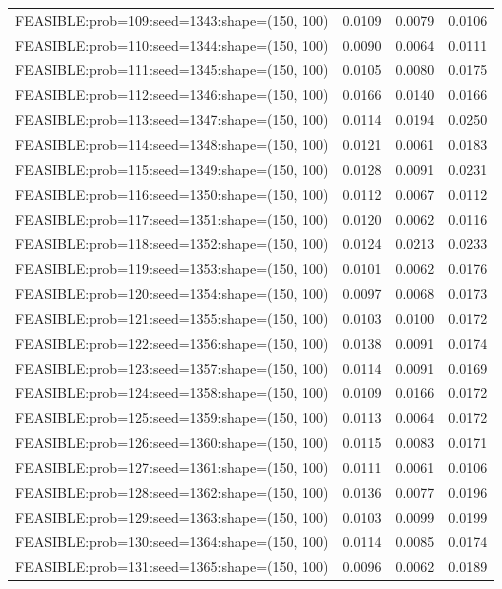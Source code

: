 \begin{longtable}{lccc}
FEASIBLE:prob=109:seed=1343:shape=(150, 100) &   0.0109 & 0.0079 & 0.0106 \\
FEASIBLE:prob=110:seed=1344:shape=(150, 100) &   0.0090 & 0.0064 & 0.0111 \\
FEASIBLE:prob=111:seed=1345:shape=(150, 100) &   0.0105 & 0.0080 & 0.0175 \\
FEASIBLE:prob=112:seed=1346:shape=(150, 100) &   0.0166 & 0.0140 & 0.0166 \\
FEASIBLE:prob=113:seed=1347:shape=(150, 100) &   0.0114 & 0.0194 & 0.0250 \\
FEASIBLE:prob=114:seed=1348:shape=(150, 100) &   0.0121 & 0.0061 & 0.0183 \\
FEASIBLE:prob=115:seed=1349:shape=(150, 100) &   0.0128 & 0.0091 & 0.0231 \\
FEASIBLE:prob=116:seed=1350:shape=(150, 100) &   0.0112 & 0.0067 & 0.0112 \\
FEASIBLE:prob=117:seed=1351:shape=(150, 100) &   0.0120 & 0.0062 & 0.0116 \\
FEASIBLE:prob=118:seed=1352:shape=(150, 100) &   0.0124 & 0.0213 & 0.0233 \\
FEASIBLE:prob=119:seed=1353:shape=(150, 100) &   0.0101 & 0.0062 & 0.0176 \\
FEASIBLE:prob=120:seed=1354:shape=(150, 100) &   0.0097 & 0.0068 & 0.0173 \\
FEASIBLE:prob=121:seed=1355:shape=(150, 100) &   0.0103 & 0.0100 & 0.0172 \\
FEASIBLE:prob=122:seed=1356:shape=(150, 100) &   0.0138 & 0.0091 & 0.0174 \\
FEASIBLE:prob=123:seed=1357:shape=(150, 100) &   0.0114 & 0.0091 & 0.0169 \\
FEASIBLE:prob=124:seed=1358:shape=(150, 100) &   0.0109 & 0.0166 & 0.0172 \\
FEASIBLE:prob=125:seed=1359:shape=(150, 100) &   0.0113 & 0.0064 & 0.0172 \\
FEASIBLE:prob=126:seed=1360:shape=(150, 100) &   0.0115 & 0.0083 & 0.0171 \\
FEASIBLE:prob=127:seed=1361:shape=(150, 100) &   0.0111 & 0.0061 & 0.0106 \\
FEASIBLE:prob=128:seed=1362:shape=(150, 100) &   0.0136 & 0.0077 & 0.0196 \\
FEASIBLE:prob=129:seed=1363:shape=(150, 100) &   0.0103 & 0.0099 & 0.0199 \\
FEASIBLE:prob=130:seed=1364:shape=(150, 100) &   0.0114 & 0.0085 & 0.0174 \\
FEASIBLE:prob=131:seed=1365:shape=(150, 100) &   0.0096 & 0.0062 & 0.0189 \\

\end{longtable}

